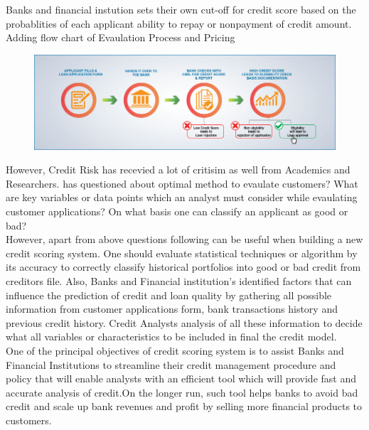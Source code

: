 {Banks and financial instution sets their own cut-off for credit score based on the probablities of each applicant ability to repay or nonpayment of credit amount.\\

Adding flow chart of Evaulation Process and Pricing
\begin{figure}
\includegraphics[width=\textwidth]{creditscoreflow.jpg}
\end{figure}

However, Credit Risk has recevied a lot of critisim as well from Academics and Researchers. \citep{al2002credit} has questioned about optimal method to evaulate customers? What are key variables or data points which an analyst must consider while evaulating customer applications? On what basis one can classify an applicant as good or bad?\\


However, apart from above questions following can be useful when building a new credit scoring system. One should evaluate statistical techniques or algorithm by its accuracy to correctly classify historical portfolios into good or bad credit from creditors file. Also, Banks and Financial institution's identified factors that can influence the prediction of credit and loan quality by gathering all possible information from customer applications form, bank transactions history and previous credit history. Credit Analysts analysis of all these information to decide what all variables or characteristics to be included in final the credit model.\\


One of the principal objectives of credit scoring system is to assist Banks and Financial Institutions to streamline their credit management procedure and policy that will enable analysts with an efficient tool which will provide fast and accurate analysis of credit.On the longer run, such tool helps banks to avoid bad credit and scale up bank revenues and profit by selling more financial products to customers.\\


}
